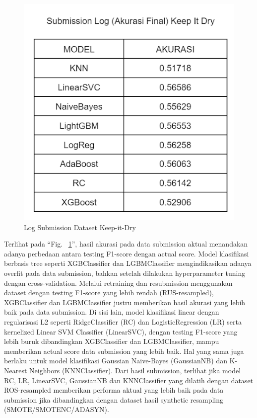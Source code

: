 \documentclass[conference]{IEEEtran}
\begin{document}
\begin{figure}[htbp]
    \centerline{\includegraphics[scale=0.4]{kid_log.png}}
    \caption{Log Submission Dataset Keep-it-Dry}
    \label{kid_log}
\end{figure}

Terlihat pada ``Fig. ~\ref{kid_log}'', hasil akurasi pada data submission aktual menandakan adanya perbedaan antara testing F1-score dengan actual score. Model klasifikasi berbasis tree seperti XGBClassifier dan LGBMClassifier 
mengindikasikan adanya overfit pada data submission, bahkan setelah dilakukan hyperparameter tuning dengan cross-validation. Melalui retraining dan resubmission menggunakan dataset dengan testing F1-score yang lebih rendah (RUS-resampled), 
XGBClassifier dan LGBMClassifier justru memberikan hasil akurasi yang lebih baik pada data submission. Di sisi lain, model klasifikasi linear dengan regularisasi L2 seperti RidgeClassifier (RC)  dan LogisticRegression (LR) serta kernelized 
Linear SVM Classifier (LinearSVC), dengan testing F1-score yang lebih buruk dibandingkan XGBClassifier dan LGBMClassifier, mampu memberikan actual score data submission yang lebih baik. Hal yang sama juga berlaku untuk model klasifikasi Gaussian Naive-Bayes 
(GaussianNB) dan K-Nearest Neighbors (KNNClassifier). Dari hasil submission, terlihat jika model RC, LR, LinearSVC, GaussianNB dan KNNClassifier yang dilatih dengan dataset ROS-resampled memberikan performa aktual yang lebih baik pada data submission jika 
dibandingkan dengan dataset hasil synthetic resampling (SMOTE/SMOTENC/ADASYN).
\end{document}
